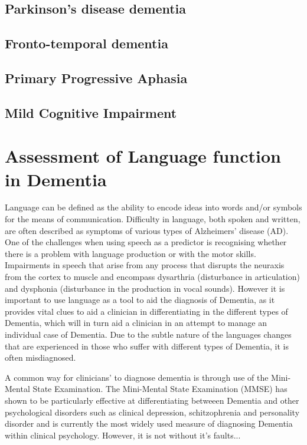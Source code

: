 \documentclass[a4paper]{article}
\begin{document}
\subsection{Parkinson's disease dementia}
\subsection{Fronto-temporal dementia}
\subsection{Primary Progressive Aphasia}
\subsection{Mild Cognitive Impairment}

\section{Assessment of Language function in Dementia}

Language can be defined as the ability to encode ideas into words and/or symbols for the means of communication. Difficulty in language, both spoken and written, are often described as symptoms of various types of Alzheimers' disease (AD). One of the challenges when using speech as a predictor is recognising whether there is a problem with language production or with the motor skills. Impairments in speech that arise from any process that disrupts the neuraxis from the cortex to muscle and encompass dysarthria (disturbance in articulation) and dysphonia (disturbance in the production in vocal sounds). However it is important to use language as a tool to aid the diagnosis of Dementia, as it provides vital clues to aid a clinician in differentiating in the different types of Dementia, which will in turn aid a clinician in an attempt to manage an individual case of Dementia. Due to the subtle nature of the languages changes that are experienced in those who suffer with different types of Dementia, it is often misdiagnosed.



A common way for clinicians' to diagnose dementia is through use of the Mini-Mental State Examination. The Mini-Mental State Examination (MMSE) has shown to be particularly effective at differentiating betweeen Dementia and other psychological disorders such as clinical depression, schitzophrenia and personality disorder and is currently the most widely used measure of diagnosing Dementia within clinical psychology.  However, it is not without it's faults...
\end{document}
